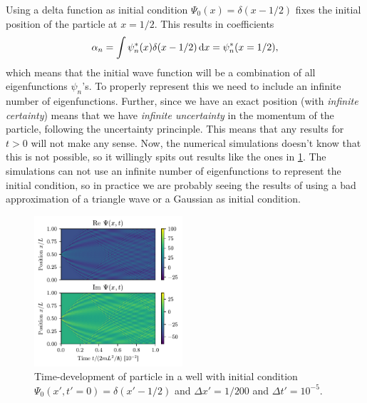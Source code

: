 Using a delta function as initial condition $\Psi_0(x) = \delta(x - 1/2)$ fixes the initial position of the particle at $x=1/2$. This results in coefficients
\begin{equation}
    \alpha_n = \int \psi_n^{*}(x)\delta(x - 1/2) \mathop{}\!\mathrm{d} x = \psi_n^{*}(x=1/2),
\end{equation}
which means that the initial wave function will be a combination of all eigenfunctions $\psi_n$'s. To properly represent this we need to include an infinite number of eigenfunctions. Further, since we have an exact position (with \emph{infinite certainty}) means that we have \emph{infinite uncertainty} in the momentum of the particle, following the uncertainty princinple. This means that any results for $t>0$ will not make any sense. Now, the numerical simulations doesn't know that this is not possible, so it willingly spits out results like the ones in \cref{fig:box_time_deltaf}. The simulations can not use an infinite number of eigenfunctions to represent the initial condition, so in practice we are probably seeing the results of using a bad approximation of a triangle wave or a Gaussian as initial condition.

\begin{figure}[ht!]%
\centering%
\includegraphics[width=0.49\textwidth]{figs/box_deltaf.pdf}%
\caption{Time-development of particle in a well with initial condition $\Psi_0(x',t'=0) = \delta(x' - 1/2)$ and $\Delta x' = 1/200$ and $\Delta t' = 10^{-5}$. \label{fig:box_time_deltaf}}%
\end{figure}

